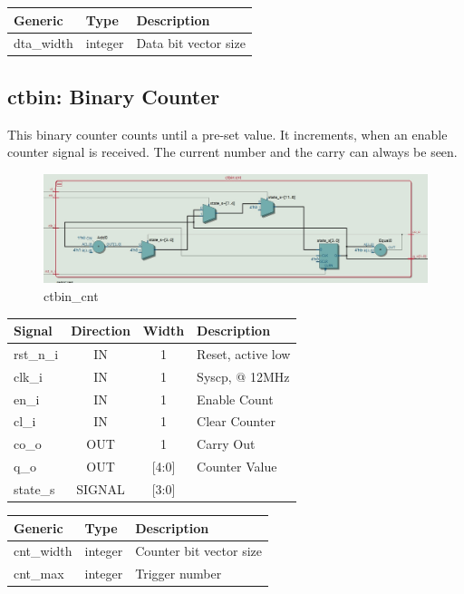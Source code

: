 \documentclass[12pt,a4 paper] {report}
\begin{document}
\begin{center}
	\begin{tabular}{| p{2cm} | p{2cm} | p{4cm} |}
	\hline
	\textbf{Generic} & \textbf{Type} & \textbf{Description} \\
	\hline
	dta\_width & integer & Data bit vector size \\
	\hline
	\end{tabular}
\end{center}

\newpage

\subsection{ctbin: Binary Counter}
This binary counter counts until a pre-set value. It increments, when an enable counter signal is received. The current 
number and the carry can always be seen.
\begin{figure}[h]
	\centering	
	\includegraphics[scale=0.3]{../png/ctbin_cnt.png}
	\caption{ctbin\_cnt}
\end{figure}
\begin{center}
	\begin{tabular}{ | p{2cm} | c | c | p{5cm} |}
		\hline
		\textbf{Signal} & \textbf{Direction} & \textbf{Width} & \textbf{Description} \\
		\hline	
 		 rst\_n\_i & IN & 1 & Reset, active low \\
 		 \hline
		clk\_i & IN & 1 & Syscp, @ 12MHz \\
		\hline
		en\_i & IN & 1 & Enable Count \\
		\hline
		cl\_i & IN & 1 & Clear Counter \\
		\hline
		co\_o & OUT & 1 & Carry Out \\
		\hline
		q\_o & OUT & [4:0] & Counter Value \\
		\hline
		\hline
		state\_s & SIGNAL & [3:0] & \\
		\hline
	\end{tabular}
\end{center}
\begin{center}
	\begin{tabular}{| p{2cm} | p{2cm} | p{4cm} |}
		\hline
		\textbf{Generic} & \textbf{Type} & \textbf{Description} \\
		\hline
 		cnt\_width & integer & Counter bit vector size \\
		\hline
		cnt\_max & integer & Trigger number \\
		\hline
	\end{tabular}	
\end{center}
\end{document}
